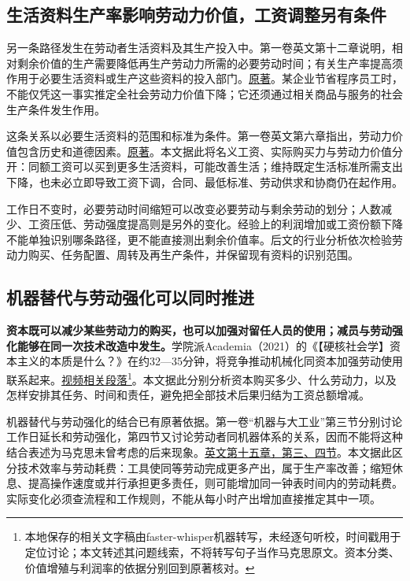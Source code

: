 \documentclass[UTF8,fontset=windows,12pt,a4paper,oneside,openany]{ctexbook}
\begin{document}
\subsection{生活资料生产率影响劳动力价值，工资调整另有条件}

另一条路径发生在劳动者生活资料及其生产投入中。第一卷英文第十二章说明，相对剩余价值的生产需要降低再生产劳动力所需的必要劳动时间；有关生产率提高须作用于必要生活资料或生产这些资料的投入部门。\href{https://www.marxists.org/archive/marx/works/1867-c1/ch12.htm}{原著}。某企业节省程序员工时，不能仅凭这一事实推定全社会劳动力价值下降；它还须通过相关商品与服务的社会生产条件发生作用。

这条关系以必要生活资料的范围和标准为条件。第一卷英文第六章指出，劳动力价值包含历史和道德因素。\href{https://www.marxists.org/archive/marx/works/1867-c1/ch06.htm}{原著}。本文据此将名义工资、实际购买力与劳动力价值分开：同额工资可以买到更多生活资料，可能改善生活；维持既定生活标准所需支出下降，也未必立即导致工资下调，合同、最低标准、劳动供求和协商仍在起作用。

工作日不变时，必要劳动时间缩短可以改变必要劳动与剩余劳动的划分；人数减少、工资压低、劳动强度提高则是另外的变化。经验上的利润增加或工资份额下降不能单独识别哪条路径，更不能直接测出剩余价值率。后文的行业分析依次检验劳动力购买、任务配置、周转及再生产条件，并保留现有资料的识别范围。

\subsection{机器替代与劳动强化可以同时推进}\label{sec:replacement-intensity}

\textbf{资本既可以减少某些劳动力的购买，也可以加强对留任人员的使用；减员与劳动强化能够在同一次技术改造中发生。}学院派Academia（2021）的《【硬核社会学】资本主义的本质是什么？》在约32—35分钟，将竞争推动机械化同资本加强劳动使用联系起来。\href{https://www.bilibili.com/video/BV1Jt4y1B72f/?t=1945}{视频相关段落}\footnote{本地保存的相关文字稿由faster-whisper机器转写，未经逐句听校，时间戳用于定位讨论；本文转述其问题线索，不将转写句子当作马克思原文。资本分类、价值增殖与利润率的依据分别回到原著核对。}。本文据此分别分析资本购买多少、什么劳动力，以及怎样安排其任务、时间和责任，避免把全部技术后果归结为工资总额增减。

机器替代与劳动强化的结合已有原著依据。第一卷“机器与大工业”第三节分别讨论工作日延长和劳动强化，第四节又讨论劳动者同机器体系的关系，因而不能将这种结合表述为马克思未曾考虑的后来现象。\href{https://www.marxists.org/archive/marx/works/1867-c1/ch15.htm}{英文第十五章，第三、四节}。本文据此区分技术效率与劳动耗费：工具使同等劳动完成更多产出，属于生产率改善；缩短休息、提高操作速度或并行承担更多责任，则可能增加同一钟表时间内的劳动耗费。实际变化必须查流程和工作规则，不能从每小时产出增加直接推定其中一项。
\end{document}
